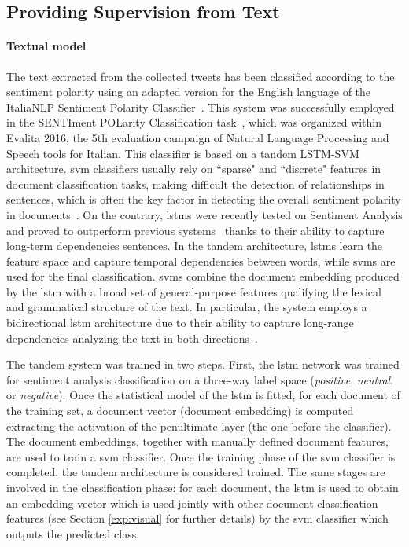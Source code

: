 
\subsection{Providing Supervision from Text}
\label{subsec:vsa:method}

\paragraph{Textual model}
The text extracted from the collected tweets has been classified according to the sentiment polarity using an adapted version for the English language of the ItaliaNLP Sentiment Polarity Classifier~\cite{cimino2016tandem}.
This system was successfully employed in the SENTIment POLarity Classification task~\cite{barbieri2016overview}, which was organized within Evalita 2016, the 5th evaluation campaign of Natural Language Processing and Speech tools for Italian.
This classifier is based on a tandem LSTM-SVM architecture.
\gls{svm} classifiers usually rely on ``sparse" and ``discrete" features in document classification tasks, making difficult the detection of relationships in sentences, which is often the key factor in detecting the overall sentiment polarity in documents~\cite{tang2015document}.
On the contrary, \glspl{lstm} were recently tested on Sentiment Analysis and proved to outperform previous systems~\cite{nakov2016semeval} thanks to their ability to capture long-term dependencies sentences.
In the tandem architecture, \glspl{lstm} learn the feature space and capture temporal dependencies between words, while \glspl{svm} are used for the final classification.
\glspl{svm} combine the document embedding produced by the \gls{lstm} with a broad set of general-purpose features qualifying the lexical and grammatical structure of the text.
In particular, the system employs a bidirectional \gls{lstm} architecture due to their ability to capture long-range dependencies analyzing the text in both directions~\cite{schuster1997bidirectional}.

The tandem system was trained in two steps.
First, the \gls{lstm} network was trained for sentiment analysis classification on a three-way label space (\emph{positive}, \emph{neutral}, or \emph{negative}).
Once the statistical model of the \gls{lstm} is fitted, for each document of the training set, a document vector (document embedding) is computed extracting the activation of the penultimate layer (the one before the classifier).
The document embeddings, together with manually defined document features, are used to train a \gls{svm} classifier.
Once the training phase of the \gls{svm} classifier is completed, the tandem architecture is considered trained.
The same stages are involved in the classification phase: for each document, the \gls{lstm} is used to obtain an embedding vector which is used jointly with other document classification features (see Section \ref{exp:visual} for further details) by the \gls{svm} classifier which outputs the predicted class.

